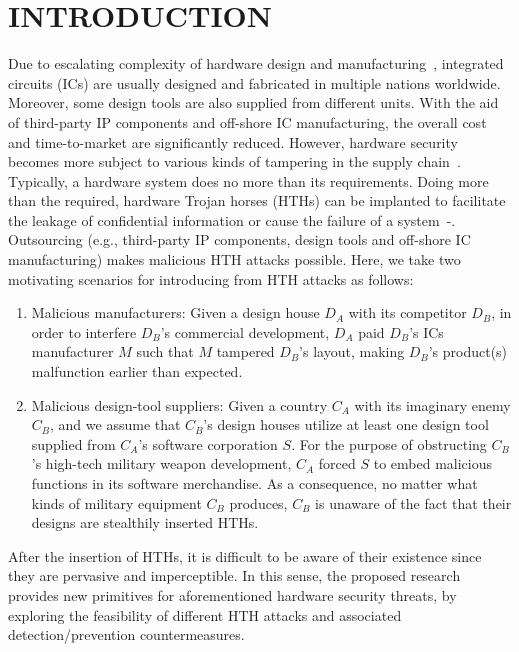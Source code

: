 \section{INTRODUCTION}
Due to escalating complexity of hardware design and manufacturing~\cite{wilson2013international}, integrated circuits (ICs) are usually designed and fabricated in multiple nations worldwide. Moreover, some design tools are also supplied from different units. With the aid of third-party IP components and off-shore IC manufacturing, the overall cost and time-to-market are significantly reduced. However, hardware security becomes more subject to various kinds of tampering in the supply chain~\cite{tehranipoor2011trustworthy}\cite{karri2010trustworthy}. Typically, a hardware system does no more than its requirements. Doing more than the required, hardware Trojan horses (HTHs) can be implanted to facilitate the leakage of confidential information or cause the failure of a system~\cite{adee2008hunt}-\cite{bhunia2014hardware}. Outsourcing (e.g., third-party IP components, design tools and off-shore IC manufacturing) makes malicious HTH attacks possible. Here, we take two motivating scenarios for introducing from HTH attacks as follows:
\begin{enumerate}[leftmargin=*]
	\item Malicious manufacturers: Given a design house $D_{A}$ with its competitor $D_{B}$, in order to interfere $D_{B}$'s commercial development, $D_{A}$ paid $D_{B}$'s ICs manufacturer $M$ such that $M$ tampered $D_{B}$'s layout, making $D_{B}$'s product(s) malfunction earlier than expected.
	\item Malicious design-tool suppliers: Given a country $C_{A}$ with its imaginary enemy $C_{B}$, and we assume that $C_{B}$'s design houses utilize at least one design tool supplied from $C_{A}$'s software corporation $S$. For the purpose of obstructing $C_{B}$'s high-tech military weapon development, $C_{A}$ forced $S$ to embed malicious functions in its software merchandise. As a consequence, no matter what kinds of military equipment $C_{B}$ produces, $C_{B}$ is unaware of the fact that their designs are stealthily inserted HTHs.
\end{enumerate}
After the insertion of HTHs, it is difficult to be aware of their existence since they are pervasive and imperceptible. In this sense, the proposed research provides new primitives for aforementioned hardware security threats, by exploring the feasibility of different HTH attacks and associated detection/prevention countermeasures.

